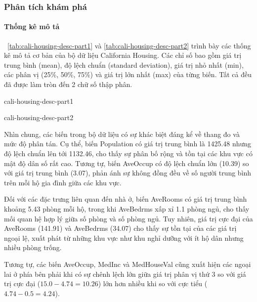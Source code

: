 \subsubsection{Phân tích khám phá}

\paragraph{Thống kê mô tả}

\tablename~\ref{tab:cali-housing-desc-part1} và
\ref{tab:cali-housing-desc-part2} trình bày các thống kê mô tả cơ bản của
bộ dữ liệu California Housing. Các chỉ số bao gồm giá trị trung bình
(mean), độ lệch chuẩn (standard deviation), giá trị nhỏ nhất (min), các
phân vị (25\%, 50\%, 75\%) và giá trị lớn nhất (max) của từng biến. Tất cả đều
đã được làm tròn đến 2 chữ số thập phân.

\begin{table}[htbp]
  \caption{Thống kê mô tả bộ dữ liệu California Housing (phần 1)}
  \label{tab:cali-housing-desc-part1}
  \centering
  {cali-housing-desc-part1}
\end{table}

\begin{table}[htbp]
  \caption{Thống kê mô tả bộ dữ liệu California Housing (phần 2)}
  \label{tab:cali-housing-desc-part2}
  \centering
  {cali-housing-desc-part2}
\end{table}

Nhìn chung, các biến trong bộ dữ liệu có sự khác biệt đáng kể về thang đo
và mức độ phân tán. Cụ thể, biến Population có giá trị trung bình
là 1425.48 nhưng độ lệch chuẩn lên tới 1132.46, cho thấy sự phân bố rộng
và tồn tại các khu vực có mật độ dân số rất cao. Tương tự, biến
AveOccup có độ lệch chuẩn lớn (10.39) so với giá trị trung bình
(3.07), phản ánh sự không đồng đều về số người trung bình trên mỗi hộ
gia đình giữa các khu vực.

Đối với các đặc trưng liên quan đến nhà ở, biến AveRooms có giá
trị trung bình khoảng 5.43 phòng mỗi hộ, trong khi AveBedrms
xấp xỉ 1.1 phòng ngủ, cho thấy mối quan hệ hợp lý giữa số phòng và số
phòng ngủ. Tuy nhiên, giá trị cực đại của AveRooms (141.91) và
AveBedrms (34.07) cho thấy sự tồn tại của các giá trị ngoại lệ, xuất
phát từ những khu vực như khu nghỉ dưỡng với ít hộ dân nhưng nhiều phòng trống.

Tương tự, các biến AveOccup, MedInc và MedHouseVal
cũng xuất hiện các ngoại lai ở phía bên phải khi có sự chênh lệch lớn giữa giá
trị phân vị thứ 3 so với giá trị cực đại ($15.0 - 4.74 = 10.26$) lớn hơn nhiều
khi so với cực tiểu ($4.74 - 0.5 = 4.24$).

